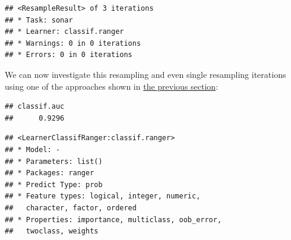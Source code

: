 \documentclass[]{article}
\newenvironment{Shaded}{\begin{snugshade}}{\end{snugshade}}
\newcommand{\CommentTok}[1]{\textcolor[rgb]{0.56,0.35,0.01}{\textit{#1}}}
\newcommand{\DecValTok}[1]{\textcolor[rgb]{0.00,0.00,0.81}{#1}}
\newcommand{\KeywordTok}[1]{\textcolor[rgb]{0.13,0.29,0.53}{\textbf{#1}}}
\newcommand{\NormalTok}[1]{#1}
\newcommand{\OperatorTok}[1]{\textcolor[rgb]{0.81,0.36,0.00}{\textbf{#1}}}
\newcommand{\StringTok}[1]{\textcolor[rgb]{0.31,0.60,0.02}{#1}}
\renewenvironment{Shaded} {\begin{snugshade}\small} {\end{snugshade}}
\begin{document}
\begin{Shaded}
\end{Shaded}

\begin{verbatim}
## <ResampleResult> of 3 iterations
## * Task: sonar
## * Learner: classif.ranger
## * Warnings: 0 in 0 iterations
## * Errors: 0 in 0 iterations
\end{verbatim}

We can now investigate this resampling and even single resampling iterations using one of the approaches shown in \protect\hyperlink{bm-exec}{the previous section}:

\begin{Shaded}
\end{Shaded}

\begin{verbatim}
## classif.auc 
##      0.9296
\end{verbatim}

\begin{Shaded}
\end{Shaded}

\begin{verbatim}
## <LearnerClassifRanger:classif.ranger>
## * Model: -
## * Parameters: list()
## * Packages: ranger
## * Predict Type: prob
## * Feature types: logical, integer, numeric,
##   character, factor, ordered
## * Properties: importance, multiclass, oob_error,
##   twoclass, weights
\end{verbatim}
\end{document}
